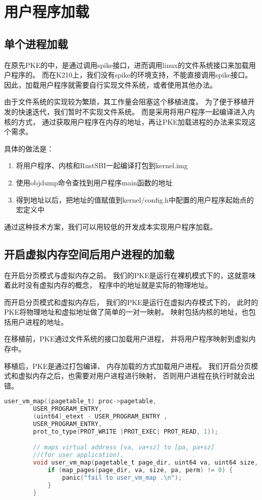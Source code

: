 \section{用户程序加载}

\subsection{单个进程加载}

在原先PKE的中，是通过调用spike接口，进而调用linux的文件系统接口来加载用户程序的。
而在K210上，我们没有spike的环境支持，不能直接调用spike接口。
因此，加载用户程序就需要自行实现文件系统，或者使用其他办法。

由于文件系统的实现较为繁琐，其工作量会阻塞这个移植进度。
为了便于移植开发的快速迭代，我们暂时不实现文件系统。
而是采用将用户程序一起编译进入内核的方式，
通过获取用户程序在内存的地址，再让PKE加载进程的办法来实现这个需求。

具体的做法是：

\begin{enumerate}
    \item 将用户程序、内核和RustSBI一起编译打包到kernel.img
    \item 使用objdump命令查找到用户程序main函数的地址
    \item 得到地址以后，把地址的值赋值到kernel/config.h中配置的用户程序起始点的宏定义中
\end{enumerate}

通过这种技术方案，我们可以用较低的开发成本实现用户程序加载。

\subsection{开启虚拟内存空间后用户进程的加载}

在开启分页模式与虚拟内存之前。
我们的PKE是运行在裸机模式下的，这就意味着此时没有虚拟内存的概念，
程序中的地址就是实际的物理地址。

而开启分页模式和虚拟内存后，
我们的PKE是运行在虚拟内存模式下的，
此时的PKE将物理地址和虚拟地址做了简单的一对一映射。
映射包括内核的地址，也包括用户进程的地址。

在移植前，PKE通过文件系统的接口加载用户进程，
并将用户程序映射到虚拟内存中。

移植后，PKE是通过打包编译、
内存加载的方式加载用户进程。
我们开启分页模式和虚拟内存之后，也需要对用户进程进行映射，
否则用户进程在执行时就会出错。

\begin{lstlisting}[caption={用户进程地址映射}, label={lst:user_process_map}, language=C]
    user_vm_map((pagetable_t) proc->pagetable,
        USER_PROGRAM_ENTRY, 
        (uint64)_etext - USER_PROGRAM_ENTRY ,
        USER_PROGRAM_ENTRY,
        prot_to_type(PROT_WRITE |PROT_EXEC| PROT_READ, 1)); 

        // maps virtual address [va, va+sz] to [pa, pa+sz] 
        //(for user application).
        void user_vm_map(pagetable_t page_dir, uint64 va, uint64 size, uint64 pa, int perm) {
            if (map_pages(page_dir, va, size, pa, perm) != 0) {
                panic("fail to user_vm_map .\n");
            }
        }
               
\end{lstlisting}

